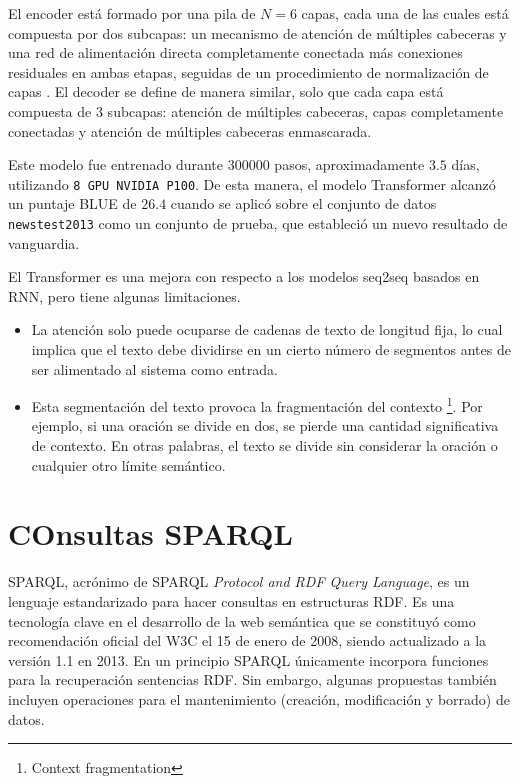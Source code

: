 \documentclass[conference]{IEEEtran}
\begin{document}
\vspace{0.2cm}


El encoder est\'a formado por una pila de $N = 6$ capas, cada una de las cuales est\'a compuesta por dos subcapas: un mecanismo de atenci\'on de m\'ultiples cabeceras y una red de alimentaci\'on directa completamente conectada m\'as conexiones residuales \cite{b2} en ambas etapas, seguidas de un procedimiento de normalizaci\'on de capas \cite{b3}. El decoder se define de manera similar, solo que cada capa est\'a compuesta de 3 subcapas: atenci\'on de m\'ultiples cabeceras, capas completamente conectadas y atenci\'on de m\'ultiples cabeceras enmascarada.

\vspace{0.2cm}

Este modelo fue entrenado durante $300000$ pasos, aproximadamente $3.5$ d\'ias, utilizando \texttt{8 GPU NVIDIA P100}. De esta manera, el modelo Transformer alcanz\'o un puntaje BLUE \cite{b4} de $26.4$ cuando se aplic\'o sobre el conjunto de datos \texttt{newstest2013} como un conjunto de prueba, que estableci\'o un nuevo resultado de vanguardia.
\vspace{0.2cm}

El Transformer es una mejora con respecto a los modelos seq2seq basados en RNN, pero tiene algunas limitaciones.

\begin{itemize}
\item La atenci\'on solo puede ocuparse de cadenas de texto de longitud fija, lo cual implica que el texto debe dividirse en un cierto n\'umero de segmentos antes de ser alimentado al sistema como entrada. 

\item Esta segmentaci\'on del texto provoca la fragmentaci\'on del contexto \footnote{Context fragmentation}. Por ejemplo, si una oraci\'on se divide en dos, se pierde una cantidad significativa de contexto. En otras palabras, el texto se divide sin considerar la oraci\'on o cualquier otro l\'imite sem\'antico.
\end{itemize}
\section{COnsultas SPARQL}

SPARQL, acrónimo de SPARQL \textit{Protocol and RDF Query Language}, es un lenguaje estandarizado para hacer consultas en estructuras RDF.  Es una tecnología clave en el desarrollo de la web semántica que se constituyó como recomendación oficial del W3C el 15 de enero de 2008, siendo actualizado a la versión 1.1 en 2013\cite{b1}. En un principio SPARQL únicamente incorpora funciones para la recuperación sentencias RDF. Sin embargo, algunas propuestas también incluyen operaciones para el mantenimiento (creación, modificación y borrado) de datos.
\end{document}
